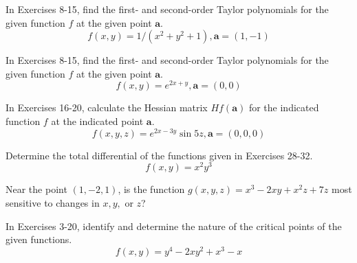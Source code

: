 \documentclass[12pt,letterpaper]{hmcpset}
\begin{document}

\begin{problem}[Colley 4.1.9]
    In Exercises 8-15, find the first- and second-order Taylor
    polynomials for the given function $f$ at the given point
    $\mathbf{a}$.
    \[
        f(x,y)=1/(x^2+y^2+1),\mathbf{a}=(1,-1)
    \]
\end{problem}
\begin{solution}
    \vfill
\end{solution}
\newpage

\begin{problem}[Colley 4.1.10]
    In Exercises 8-15, find the first- and second-order Taylor
    polynomials for the given function $f$ at the given point
    $\mathbf{a}$.
    \[
        f(x,y)=e^{2x+y},\mathbf{a}=(0,0)
    \]
\end{problem}
\begin{solution}
    \vfill
\end{solution}
\newpage

\begin{problem}[Colley 4.1.20]
    In Exercises 16-20, calculate the Hessian matrix $Hf(\mathbf{a})$
    for the indicated function $f$ at the indicated point
    $\mathbf{a}$.
    \[
        f(x,y,z)=e^{2x-3y}\sin 5z,\mathbf{a}=(0,0,0)
    \]
\end{problem}
\begin{solution}
    \vfill
\end{solution}
\newpage

\begin{problem}[Colley 4.1.28]
    Determine the total differential of the functions given in
    Exercises 28-32.
    \[
        f(x,y)=x^2y^3
    \]
\end{problem}
\begin{solution}
    \vfill
\end{solution}
\newpage

\begin{problem}[Colley 4.1.34]
    Near the point $(1,-2, 1)$, is the function
    $g(x,y,z)=x^3-2xy+x^2z+7z$ most sensitive to changes in $x,y,$ or
    $z$?
\end{problem}
\begin{solution}
    \vfill
\end{solution}
\newpage

\begin{problem}[Colley 4.2.6]
    In Exercises 3-20, identify and determine the nature of the
    critical points of the given functions.
    \[
        f(x,y)=y^4-2xy^2+x^3-x
    \]
\end{problem}
\begin{solution}
    \vfill
\end{solution}
\newpage
\end{document}
